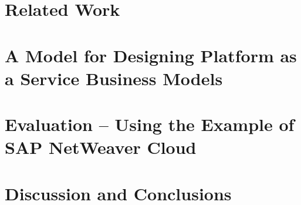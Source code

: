 \documentclass[12pt,a4paper,oneside,notitlepage,USenglish]{scrreprt}
\begin{document}







			\chapter{Related Work}\label{ch:rw}


			
			\chapter{A Model for Designing Platform as a Service Business Models}\label{ch:dm}

			\chapter{Evaluation -- Using the Example of SAP NetWeaver Cloud}\label{ch:esap}

			\chapter{Discussion and Conclusions}\label{ch:dc}













\appendix
\titleformat{\chapter}{\Large}{\textbf{\appendixname~\Large\thechapter}}{15pt}{\textbf}



\end{document}
